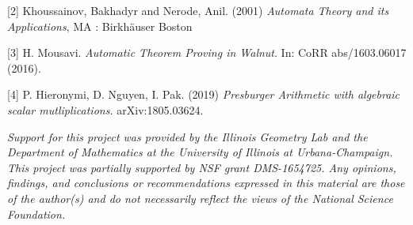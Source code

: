 \documentclass[landscape,usenames,dvipsnames, 25pt]{sciposter}
\begin{document}
\begin{multicols}{3}
{[2] Khoussainov, Bakhadyr and Nerode, Anil. (2001) \emph{Automata Theory and its Applications}, MA : Birkh\"auser Boston

[3] H. Mousavi. \emph{Automatic Theorem Proving in Walnut}. In: CoRR abs/1603.06017 (2016).

[4] P. Hieronymi, D. Nguyen, I. Pak. (2019) \emph{Presburger Arithmetic with algebraic scalar mutliplications.} arXiv:1805.03624.
}

\footnotesize\emph{Support for this project was provided by the Illinois Geometry Lab and the Department of Mathematics at the University of Illinois at Urbana-Champaign. This project was partially supported by NSF grant DMS-1654725. Any opinions, findings, and conclusions or recommendations expressed in this material are those of the author(s) and do not necessarily reflect the views of the National Science Foundation.}
\end{multicols}
\end{document}
